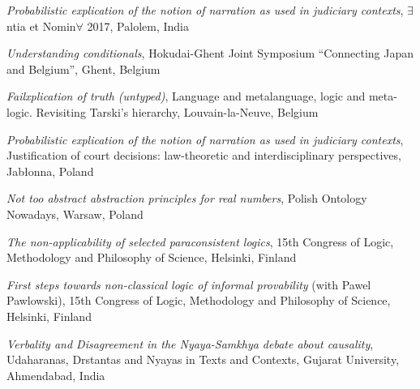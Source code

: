 \documentclass[10pt, a4paper]{article}
\newcommand{\years}[1]{\marginnote{\normalsize #1}}
\begin{document}
\vspace{0.5mm}

\emph{Probabilistic explication of the notion of narration as used in judiciary contexts}, $\exists$ntia et Nomin$\forall$ 2017,  Palolem, India


\vspace{0.5mm}


\years{2016} \emph{Understanding conditionals}, Hokudai-Ghent Joint Symposium “Connecting Japan and Belgium”,  Ghent, Belgium


\vspace{0.5mm}


\emph{Failxplication of truth (untyped)}, Language and metalanguage, logic and meta-logic. Revisiting Tarski's hierarchy,  Louvain-la-Neuve, Belgium


\vspace{0.5mm}

\emph{Probabilistic explication of the notion of narration as used in judiciary contexts}, Justification of court decisions: law-theoretic and interdisciplinary perspectives,  Jab{\l}onna, Poland


\vspace{0.5mm}


\emph{Not too abstract abstraction principles for real numbers}, Polish Ontology Nowadays,  Warsaw, Poland


\vspace{0.5mm}

 \years{2015} \emph{The non-applicability of selected paraconsistent logics}, 15th Congress of Logic, Methodology and Philosophy of Science,  Helsinki, Finland



\vspace{0.5mm}

 \emph{First steps towards non-classical logic of informal provability} (with Pawel Pawlowski), 15th Congress of Logic, Methodology and Philosophy of Science,  Helsinki, Finland





\vspace{0.5mm}


\years{2014} \emph{Verbality and Disagreement in the Nyaya-Samkhya debate about causality}, Udaharanas, Drstantas and Nyayas in Texts and Contexts,  Gujarat University, Ahmendabad, India
\end{document}
